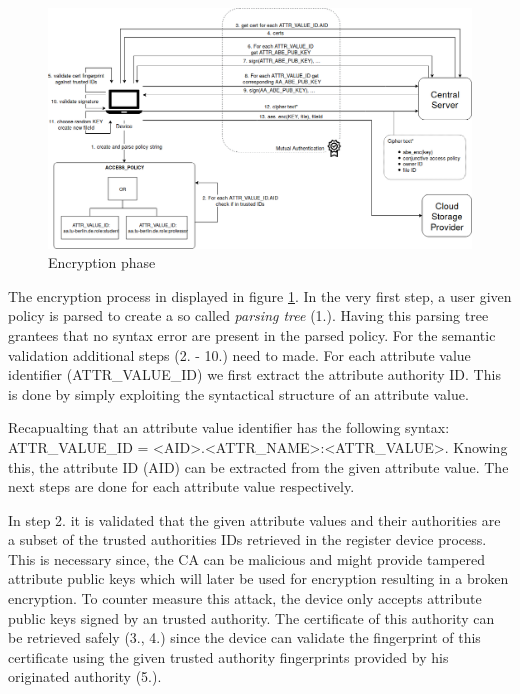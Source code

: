 \begin{figure}[!t]
\centering
    \includegraphics[width=1\linewidth]{img/encryption.png}
    \caption{Encryption phase}
    \label{fig:tfdacmacs-encrypt}
\end{figure}

The encryption process in displayed in figure \ref{fig:tfdacmacs-encrypt}. In the very first step, a user given policy is parsed to create a so called \textit{parsing tree} (1.). Having this parsing tree grantees that no syntax error are present in the parsed policy. For the semantic validation additional steps (2. - 10.) need to made. For each attribute value identifier (ATTR\_VALUE\_ID) we first extract the attribute authority ID. This is done by simply exploiting the syntactical structure of an attribute value. 

Recapualting that an attribute value identifier has the following syntax: \\ATTR\_VALUE\_ID = <AID>.<ATTR\_NAME>:<ATTR\_VALUE>. Knowing this, the attribute ID (AID) can be extracted from the given attribute value. The next steps are done for each attribute value respectively. 

In step 2. it is validated that the given attribute values and their authorities are a subset of the trusted authorities IDs retrieved in the register device process. This is necessary since, the CA can be malicious and might provide tampered attribute public keys which will later be used for encryption resulting in a broken encryption. To counter measure this attack, the device only accepts attribute public keys signed by an trusted authority. The certificate of this authority can be retrieved safely (3., 4.) since the device can validate the fingerprint of this certificate using the given trusted authority fingerprints provided by his originated authority (5.).  

